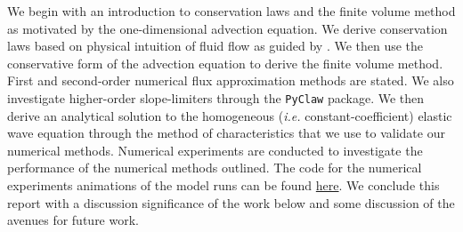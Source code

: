 \documentclass[review,onefignum,onetabnum]{siamart171218}
\begin{document}
We begin with an introduction to conservation laws and the finite volume method as motivated by the one-dimensional advection equation. We derive conservation laws based on physical intuition of fluid flow as guided by  \cite{leveque_2002}. We then use the conservative form of the advection equation to derive the finite volume method. First and second-order numerical flux approximation methods are stated. We also investigate higher-order slope-limiters through the 
\texttt{PyClaw} package. We then derive an analytical solution to the homogeneous (\textit{i.e.} constant-coefficient) elastic wave equation through the method of characteristics that we use to validate our numerical methods. Numerical experiments are conducted to investigate the performance of the numerical methods outlined. The code for the numerical experiments animations of the model runs can be found \href{https://github.com/andrewdnolan/MATH-709-Final-Project}{here}. We conclude this report with a discussion significance of the work below and some discussion of the avenues for future work. 



\end{document}
